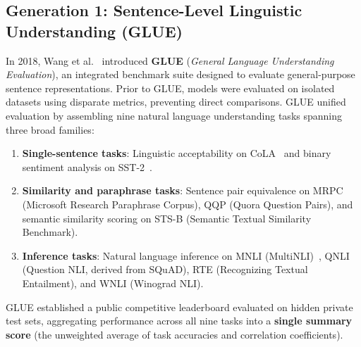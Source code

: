 \documentclass[../../main.tex]{subfiles}
\begin{document}
\subsection{Generation 1: Sentence-Level Linguistic Understanding (GLUE)}
\label{subsec:glue_benchmark}

In 2018, Wang et al.~\cite{wang2018glue} introduced \textbf{GLUE} (\textit{General Language Understanding Evaluation}), an integrated benchmark suite designed to evaluate general-purpose sentence representations. Prior to GLUE, models were evaluated on isolated datasets using disparate metrics, preventing direct comparisons. GLUE unified evaluation by assembling nine natural language understanding tasks spanning three broad families:
\begin{enumerate}
    \item \textbf{Single-sentence tasks}: Linguistic acceptability on CoLA~\cite{warstadt2019cola} and binary sentiment analysis on SST-2~\cite{socher2013sst}.
    \item \textbf{Similarity and paraphrase tasks}: Sentence pair equivalence on MRPC (Microsoft Research Paraphrase Corpus), QQP (Quora Question Pairs), and semantic similarity scoring on STS-B (Semantic Textual Similarity Benchmark).
    \item \textbf{Inference tasks}: Natural language inference on MNLI (MultiNLI)~\cite{williams2018multinli}, QNLI (Question NLI, derived from SQuAD), RTE (Recognizing Textual Entailment), and WNLI (Winograd NLI).
\end{enumerate}
GLUE established a public competitive leaderboard evaluated on hidden private test sets, aggregating performance across all nine tasks into a \textbf{single summary score} (the unweighted average of task accuracies and correlation coefficients).
\end{document}
